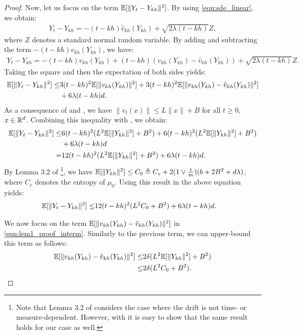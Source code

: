 \begin{proof}
Now, let us focus on the term $\mathbb{E}[ \|Y_t - Y_{kh} \|^2]$. By using \eqref{eqn:sde_linear}, we obtain:
\begin{align}
Y_t - Y_{kh} = - (t-kh) \hat{v}_{kh}(Y_{kh}) + \sqrt{2 \lambda (t-kh)} Z,
\end{align}
where $Z$ denotes a standard normal random variable. By adding and subtracting the term $-(t-kh) v_{kh}(Y_{kh})$, we have:
\begin{align}
Y_t - Y_{kh} = -(t-kh)v_{kh}(Y_{kh}) + (t-kh)(v_{kh}(Y_{kh}) - \hat{v}_{kh}(Y_{kh})) + \sqrt{2 \lambda (t-kh)} Z.
\end{align}
Taking the square and then the expectation of both sides yields:
\begin{align}
\nonumber \mathbb{E}[ \|Y_t - Y_{kh} \|^2] \leq& 3(t-kh)^2 \mathbb{E}[ \|v_{kh}(Y_{kh})\|^2] + 3 (t-kh)^2 \mathbb{E}[\|v_{kh}(Y_{kh}) - \hat{v}_{kh}(Y_{kh})\|^2] \\
&+ 6\lambda (t-kh)d.
\end{align}
As a consequence of  and , we have $\| v_t(x)\| \leq L\|x\|+B$ for all $t \geq 0$, $x\in \mathbb{R}^d$. Combining this inequality with , we obtain:
\begin{align}
\nonumber \mathbb{E}[ \|Y_t - Y_{kh} \|^2] \leq& 6(t-kh)^2 (L^2 \mathbb{E}[ \|Y_{kh}\|^2] + B^2) + 6(t-kh)^2 (L^2 \mathbb{E}[ \|Y_{kh}\|^2] + B^2) \\
&+ 6\lambda (t-kh)d\\
=& 12(t-kh)^2 (L^2 \mathbb{E}[ \|Y_{kh}\|^2] + B^2) + 6\lambda (t-kh)d.
\end{align}
By Lemma 3.2 of \cite{raginsky17a}\footnote{Note that Lemma 3.2 of \cite{raginsky17a} considers the case where the drift is not time- or measure-dependent. However, with  it is easy to show that the same result holds for our case as well.}, we have $\mathbb{E}[ \|Y_{kh}\|^2] \leq C_0 \triangleq C_e +2  (1 \vee \frac1{m})(b+2B^2 + d \lambda)$, where $C_e$ denotes the entropy of $\mu_0$. Using this result in the above equation yields:
\begin{align}
\mathbb{E}[ \|Y_t - Y_{kh} \|^2] \leq& 12(t-kh)^2 (L^2 C_0 + B^2) + 6\lambda (t-kh)d. \label{eqn:lem_bound1}
\end{align}

We now focus on the term $\mathbb{E}[ \|v_{kh}(Y_{kh}) - \hat{v}_{kh}(Y_{kh}) \|^2 ]$ in \eqref{eqn:lem1_proof_interm}. Similarly to the previous term, we can upper-bound this term as follows:
\begin{align}
\mathbb{E}[ \|v_{kh}(Y_{kh}) - \hat{v}_{kh}(Y_{kh}) \|^2 ] \leq& 2 \delta(L^2 \mathbb{E}[\|Y_{kh}\|^2] + B^2) \\
\leq& 2 \delta(L^2 C_0 + B^2). \label{eqn:lem_bound2}
\end{align}


\end{proof}
